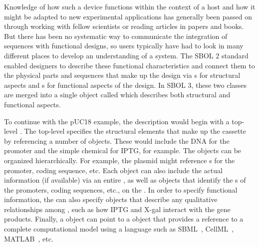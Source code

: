 Knowledge of how such a device functions within the context of a host and how it might be adapted to new experimental applications has generally been passed on through working with fellow scientists or reading articles in papers and books. 
But there has been no systematic way to communicate the integration of sequences with functional designs, so users typically have had to look in many different places to develop an understanding of a system.  The SBOL 2 standard enabled designers to describe these functional characteristics and connect them to the physical parts and sequences that make up the design via s for structural aspects and s for functional aspects of the design.
In SBOL 3, these two classes are merged into a single object called  which describes both structural and functional aspects.

To continue with the pUC18 example, the description would begin with a top-level .  The top-level  specifies the structural elements that make up the cassette by referencing a number of  objects. These would include the DNA  for the promoter and the simple chemical
 for IPTG, for example.  
The  objects can be organized hierarchically.  For example, the plasmid  might reference s for the promoter, coding sequence, etc.  Each  object can also include the actual  information (if available) via an entire  , as well as  objects that identify the s of the promoters, coding sequences, etc., on the .  In order to specify functional information, the  can also specify  objects that describe any qualitative relationships among  , such as how IPTG and X-gal interact with the gene products.  Finally, a  object can point to a  object that provides a reference to a complete computational model using a language such as SBML~\cite{SBML}, CellML~\cite{CellML}, MATLAB~\cite{matlab}, etc.

